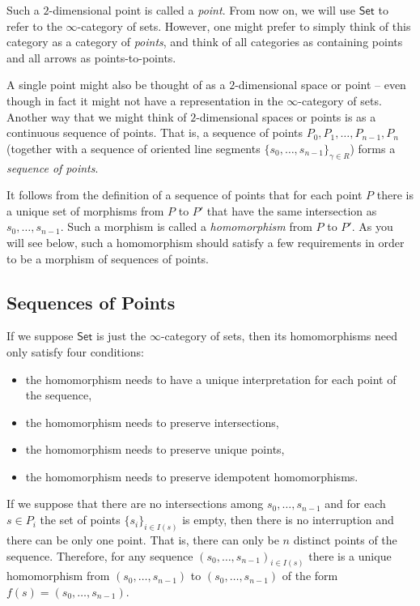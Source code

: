 \documentclass[a4paper,reqno,oneside]{article}
\begin{document}
Such a $2$-dimensional point is called a \emph{point}.  From now on, we will use $\mathsf{Set}$ to refer to the $\infty$-category of sets.   However, one might prefer to simply think of this category as a category of \emph{points}, and think of all categories as containing points and all arrows as points-to-points.   

A single point might also be thought of as a $2$-dimensional space or point -- even though in fact it might not have a representation in the $\infty$-category of sets.    Another way that we might think of $2$-dimensional spaces or points is as a continuous sequence of points.  That is, a sequence of points $P_0,P_1,\ldots,P_{n-1},P_n$ (together with a sequence of oriented line segments $\{s_0,\ldots,s_{n-1}\}_{\gamma \in R}$) forms a \emph{sequence of points}.  

It follows from the definition of a sequence of points that for each point $P$ there is a unique set of morphisms from $P$ to $P'$ that have the same intersection as $s_0,\ldots,s_{n-1}$.  Such a morphism is called a \emph{homomorphism} from $P$ to $P'$.  As you will see below, such a homomorphism should satisfy a few requirements in order to be a morphism of sequences of points.  


\subsection{Sequences of Points}\label{subsec:sequence}

If we suppose $\mathsf{Set}$ is just the $\infty$-category of sets, then its homomorphisms need only satisfy four conditions: 

\begin{itemize}[label={(\alph*):(\Roman*)}]
\item the homomorphism needs to have a unique interpretation for each point of the sequence,
\item the homomorphism needs to preserve intersections,
\item the homomorphism needs to preserve unique points,
\item the homomorphism needs to preserve idempotent homomorphisms.
\end{itemize}


If we suppose that there are no intersections among $s_0,\ldots,s_{n-1}$ and for each $s\in P_i$ the set of points $\{s_i\}_{i\in I(s)}$ is empty, then there is no interruption and there can be only one point.  That is, there can only be $n$ distinct points of the sequence.  Therefore, for any sequence $\left({s_0,\ldots,s_{n-1}}\right)_{i\in I(s)}$ there is a unique homomorphism from $\left({s_0,\ldots,s_{n-1}}\right)$ to $\left({s_0,\ldots,s_{n-1}}\right)$ of the form $f(s)=\left({s_0,\ldots,s_{n-1}}\right)$.
\end{document}
